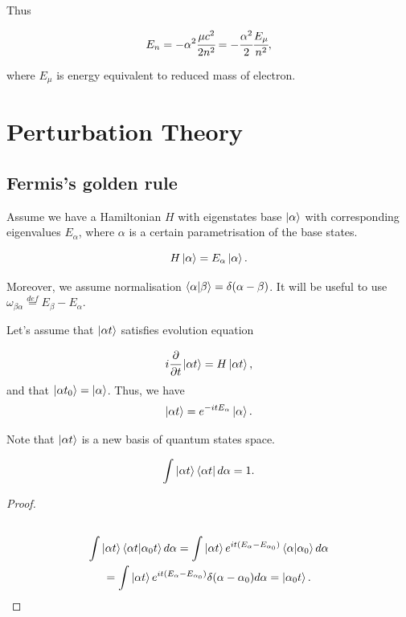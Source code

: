 \documentclass[main.tex]{subfiles}
\begin{document}
Thus

\begin{equation}
E_n = - \alpha^2 \cfrac{\mu c^2}{2 n^2} = - \cfrac{\alpha^2}{2} \cfrac{E_\mu}{n^2},
\end{equation}

where $E_\mu$ is energy equivalent to reduced mass of electron.

\section{Perturbation Theory}
\subsection{Fermis's golden rule}
\label{fermi-golden-rule}
Assume we have a Hamiltonian $H$ with eigenstates base $\ket{\alpha}$ with corresponding eigenvalues $E_\alpha$, where $\alpha$ is a certain parametrisation of the base states. 

\begin{equation}
H \ket{\alpha} = E_{\alpha} \ket{\alpha}.
\end{equation}

Moreover, we assume normalisation $\bra{\alpha}\ket{\beta} = \delta(\alpha - \beta)$. It will be useful to use $\omega_{\beta\alpha} \stackrel{def}{=} E_\beta - E_\alpha$.


Let's assume that $\ket{\alpha t}$ satisfies evolution equation

\begin{equation}
i\cfrac{\partial}{\partial t} \ket{\alpha t} = H\ket{\alpha t},
\end{equation}
and that $\ket{\alpha t_0} = \ket{\alpha}$. Thus, we have
\begin{equation}
\ket{\alpha t} = e^{-itE_\alpha} \ket{\alpha}.
\end{equation}

Note that $\ket{\alpha t}$ is a new basis of quantum states space.
\begin{proposition}
\label{timed-unity-decomposition}
\begin{equation}
\int \ket{\alpha t}\bra{\alpha t} d\alpha = 1.
\end{equation}
\end{proposition}
\begin{proof}
\begin{multline*}\\
\int \ket{\alpha t}\bra{\alpha t}\ket{\alpha_0 t} d\alpha = 
\int \ket{\alpha t} e^{it(E_\alpha - E_{\alpha_0})}\bra{\alpha}\ket{\alpha_0} d\alpha\\
= \int \ket{\alpha t} e^{it(E_\alpha - E_{\alpha_0})} \delta(\alpha - \alpha_0) d\alpha = \ket{\alpha_0 t}.\\
\end{multline*}
\end{proof}
\end{document}
